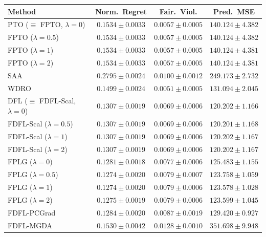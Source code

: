 \begin{table}[htbp]
\smallskip
\begin{tabular}{l ccc}
\toprule
Method & Norm.\ Regret & Fair.\ Viol. & Pred.\ MSE \\
\midrule
PTO ($\equiv$ FPTO, $\lambda\!=\!0$)         & $0.1534 \pm 0.0033$ & $0.0057 \pm 0.0005$ & $140.124 \pm 4.382$ \\
FPTO ($\lambda\!=\!0.5$)                     & $0.1534 \pm 0.0033$ & $0.0057 \pm 0.0005$ & $140.124 \pm 4.382$ \\
FPTO ($\lambda\!=\!1$)                       & $0.1534 \pm 0.0033$ & $0.0057 \pm 0.0005$ & $140.124 \pm 4.381$ \\
FPTO ($\lambda\!=\!2$)                       & $0.1534 \pm 0.0033$ & $0.0057 \pm 0.0005$ & $140.124 \pm 4.381$ \\
\midrule
SAA                                          & $0.2795 \pm 0.0024$ & $0.0100 \pm 0.0012$ & $249.173 \pm 2.732$ \\
WDRO                                         & $0.1499 \pm 0.0024$ & $\mathbf{0.0051 \pm 0.0005}$ & $131.094 \pm 2.045$ \\
\midrule
DFL ($\equiv$ FDFL-Scal, $\lambda\!=\!0$)    & $0.1307 \pm 0.0019$ & $0.0069 \pm 0.0006$ & $120.202 \pm 1.166$ \\
FDFL-Scal ($\lambda\!=\!0.5$)                & $0.1307 \pm 0.0019$ & $0.0069 \pm 0.0006$ & $\mathbf{120.201 \pm 1.168}$ \\
FDFL-Scal ($\lambda\!=\!1$)                  & $0.1307 \pm 0.0019$ & $0.0069 \pm 0.0006$ & $120.202 \pm 1.167$ \\
FDFL-Scal ($\lambda\!=\!2$)                  & $0.1307 \pm 0.0019$ & $0.0069 \pm 0.0006$ & $120.202 \pm 1.167$ \\
\midrule
FPLG ($\lambda\!=\!0$)                       & $0.1281 \pm 0.0018$ & $0.0077 \pm 0.0006$ & $125.483 \pm 1.155$ \\
FPLG ($\lambda\!=\!0.5$)                     & $0.1274 \pm 0.0020$ & $0.0079 \pm 0.0007$ & $123.758 \pm 1.059$ \\
FPLG ($\lambda\!=\!1$)                       & $\mathbf{0.1274 \pm 0.0020}$ & $0.0079 \pm 0.0006$ & $123.578 \pm 1.028$ \\
FPLG ($\lambda\!=\!2$)                       & $0.1275 \pm 0.0019$ & $0.0079 \pm 0.0006$ & $123.599 \pm 1.045$ \\
\midrule
FDFL-PCGrad                                  & $0.1284 \pm 0.0020$ & $0.0087 \pm 0.0019$ & $129.420 \pm 0.927$ \\
FDFL-MGDA                                    & $0.1530 \pm 0.0042$ & $0.0128 \pm 0.0010$ & $351.698 \pm 9.948$ \\
\bottomrule
\end{tabular}

\end{table}
